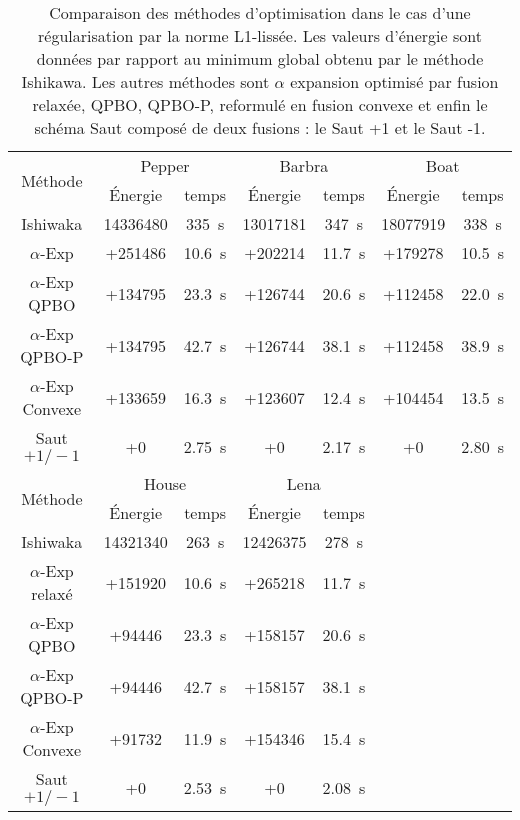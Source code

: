 \documentclass[../main/These_Mathias_Paget.tex]{subfiles}
\begin{document}
\begin{table}
\centering
\begin{tabular}{c|cc|cc|cc}
\hline
\multirow{2}{*}{Méthode} & \multicolumn{2}{c|}{Pepper} & \multicolumn{2}{c|}{Barbra} & \multicolumn{2}{c}{Boat} \\ 
 & Énergie & temps & Énergie & temps & Énergie & temps  \\
\hline
Ishiwaka & \num{14336480} & \SI{335}{s} & \num{13017181
} & \SI{347}{s} &  \num{18077919} & \SI{338}{s}  \\
$\alpha$-Exp & +\num{251486} & \SI{10.6}{s} & +\num{202214} & \SI{11.7}{s} & +\num{179278} & \SI{10.5}{s}  \\
$\alpha$-Exp QPBO & +\num{134795} & \SI{23.3}{s} & +\num{126744} & \SI{20.6}{s} & +\num{112458} & \SI{22.0}{s} \\
$\alpha$-Exp QPBO-P & +\num{134795} & \SI{42.7}{s} & +\num{126744} & \SI{38.1}{s} & +\num{112458} &  \SI{38.9}{s} \\
$\alpha$-Exp Convexe & +\num{133659} & \SI{16.3}{s} & +\num{123607} & \SI{12.4}{s} & +\num{104454} & \SI{13.5}{s} \\
Saut $+1/-1$ & +\num{0} & \SI{2.75}{s} & +\num{0} & \SI{2.17}{s} & +\num{0} & \SI{2.80}{s} \\
\hline
\multirow{2}{*}{Méthode} & \multicolumn{2}{c|}{House} & \multicolumn{2}{c|}{Lena} \\ 
 & Énergie & temps & Énergie & temps  \\
\cline{1-5}
Ishiwaka & \num{14321340} & \SI{263}{s} & \num{12426375
} & \SI{278}{s} \\
$\alpha$-Exp relaxé & +\num{151920} & \SI{10.6}{s} & +\num{265218} & \SI{11.7}{s}  \\
$\alpha$-Exp QPBO & +\num{94446} & \SI{23.3}{s} & +\num{158157} & \SI{20.6}{s} \\
$\alpha$-Exp QPBO-P & +\num{94446} & \SI{42.7}{s} & +\num{158157} & \SI{38.1}{s}\\
$\alpha$-Exp Convexe & +\num{91732} & \SI{11.9}{s} & +\num{154346} & \SI{15.4}{s} \\
Saut $+1/-1$ & +\num{0} & \SI{2.53}{s} & +\num{0} & \SI{2.08}{s} \\
\end{tabular}
\caption{Comparaison des méthodes d'optimisation dans le cas d'une régularisation par la norme L1-lissée. Les valeurs d’énergie sont données par rapport au minimum global obtenu par le méthode Ishikawa. Les autres méthodes sont $\alpha$ expansion optimisé par fusion relaxée, QPBO, QPBO-P, reformulé en fusion convexe et enfin le schéma Saut composé de deux fusions : le Saut +1 et le Saut -1.}
\label{tab:L1_L2}
\end{table}
\end{document}
